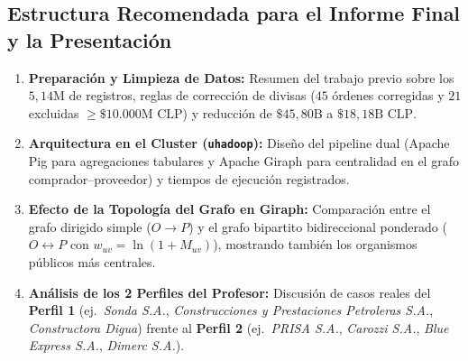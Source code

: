 \documentclass[10pt,letterpaper]{article}
\begin{document}
\subsection*{Estructura Recomendada para el Informe Final y la Presentación}
\begin{enumerate}[leftmargin=*, nosep]
    \item \textbf{Preparación y Limpieza de Datos:} Resumen del trabajo previo sobre los $5,14\text{M}$ de registros, reglas de corrección de divisas ($45$ órdenes corregidas y $21$ excluidas $\ge \$10.000\text{M CLP}$) y reducción de $\$45,80\text{B}$ a $\$18,18\text{B CLP}$.
    \item \textbf{Arquitectura en el Cluster (\texttt{uhadoop}):} Diseño del pipeline dual (Apache Pig para agregaciones tabulares y Apache Giraph para centralidad en el grafo comprador--proveedor) y tiempos de ejecución registrados.
    \item \textbf{Efecto de la Topología del Grafo en Giraph:} Comparación entre el grafo dirigido simple ($O \to P$) y el grafo bipartito bidireccional ponderado ($O \leftrightarrow P$ con $w_{uv} = \ln(1+M_{uv})$), mostrando también los organismos públicos más centrales.
    \item \textbf{Análisis de los 2 Perfiles del Profesor:} Discusión de casos reales del \textbf{Perfil 1} (ej.\ \textit{Sonda S.A.}, \textit{Construcciones y Prestaciones Petroleras S.A.}, \textit{Constructora Digua}) frente al \textbf{Perfil 2} (ej.\ \textit{PRISA S.A.}, \textit{Carozzi S.A.}, \textit{Blue Express S.A.}, \textit{Dimerc S.A.}).
\end{enumerate}
\end{document}
